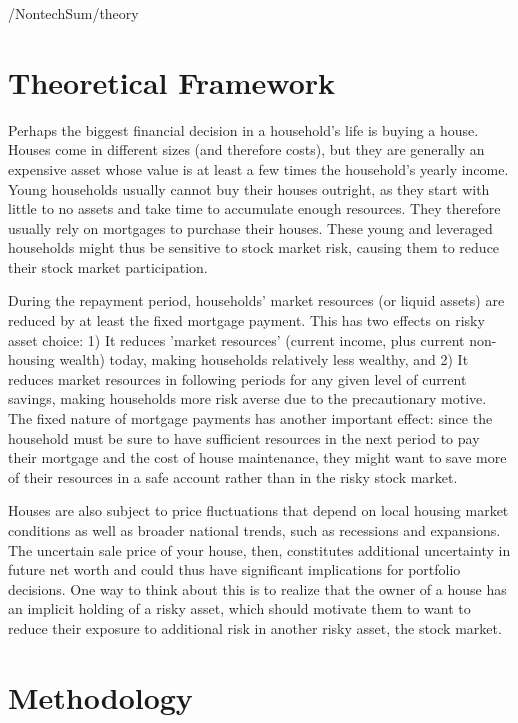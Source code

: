 \documentclass[PortfolioChoiceWithRiskyHousing]{subfiles}
\begin{document}
\begin{verbatimwrite}{\LaTeXOutput/NontechSum/theory}

  \section{Theoretical Framework}

  Perhaps the biggest financial decision in a household's life is buying a house. Houses come in different sizes (and therefore costs), but they are generally an expensive asset whose value is at least a few times the household's yearly income. Young households usually cannot buy their houses outright, as they start with little to no assets and take time to accumulate enough resources. They therefore usually rely on mortgages to purchase their houses. These young and leveraged households might thus be sensitive to stock market risk, causing them to reduce their stock market participation.

  During the repayment period, households' market resources (or liquid assets) are reduced by at least the fixed mortgage payment. This has two effects on risky asset choice: 1) It reduces 'market resources' (current income, plus current non-housing wealth) today, making households relatively less wealthy, and 2) It reduces market resources in following periods for any given level of current savings, making households more risk averse due to the precautionary motive. The fixed nature of mortgage payments has another important effect: since the household must be sure to have sufficient resources in the next period to pay their mortgage and the cost of house maintenance, they might want to save more of their resources in a safe account rather than in the risky stock market.

  Houses are also subject to price fluctuations that depend on local housing market conditions as well as broader national trends, such as recessions and expansions. The uncertain sale price of your house, then, constitutes additional uncertainty in future net worth and could thus have significant implications for portfolio decisions. One way to think about this is to realize that the owner of a house has an implicit holding of a risky asset, which should motivate them to want to reduce their exposure to additional risk in another risky asset, the stock market.

\end{verbatimwrite}


\section{Methodology}
\end{document}
